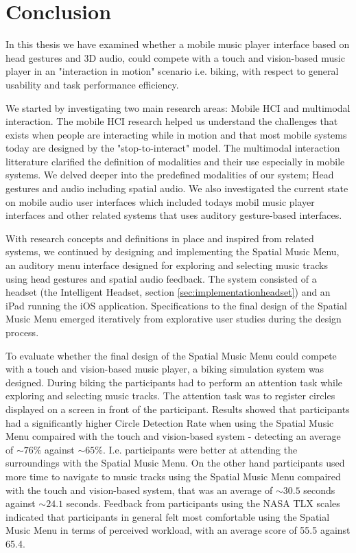 \chapter{Conclusion}
In this thesis we have examined whether a mobile music player interface based on head gestures and 3D audio, could compete with a touch and vision-based music player in an "interaction in motion" scenario i.e. biking, with respect to general usability and task performance efficiency.

We started by investigating two main research areas: Mobile HCI and multimodal interaction. The mobile HCI research helped us understand the challenges that exists when people are interacting while in motion and that most mobile systems today are designed by the "stop-to-interact" model. The multimodal interaction litterature clarified the definition of modalities and their use especially in mobile systems. We delved deeper into the predefined modalities of our system; Head gestures and audio including spatial audio. We also investigated the current state on mobile audio user interfaces which included todays mobil music player interfaces and other related systems that uses auditory gesture-based interfaces.

With research concepts and definitions in place and inspired from related systems, we continued by designing and implementing the Spatial Music Menu, an auditory menu interface designed for exploring and selecting music tracks using head gestures and spatial audio feedback. The system consisted of a headset (the Intelligent Headset, section \ref{sec:implementationheadset}) and an iPad running the iOS application. Specifications to the final design of the Spatial Music Menu emerged iteratively from explorative user studies during the design process.

To evaluate whether the final design of the Spatial Music Menu could compete with a touch and vision-based music player, a biking simulation system was designed. During biking the participants had to perform an attention task while exploring and selecting music tracks. The attention task was to register circles displayed on a screen in front of the participant. Results showed that participants had a significantly higher Circle Detection Rate when using the Spatial Music Menu compaired with the touch and vision-based system - detecting an average of $\sim 76\%$ against $\sim 65\%$. I.e. participants were better at attending the surroundings with the Spatial Music Menu. On the other hand participants used more time to navigate to music tracks using the Spatial Music Menu compaired with the touch and vision-based system, that was an average of $\sim 30.5$ seconds against $\sim 24.1$ seconds. Feedback from participants using the NASA TLX scales indicated that participants in general felt most comfortable using the Spatial Music Menu in terms of perceived workload, with an average score of 55.5 against 65.4.

